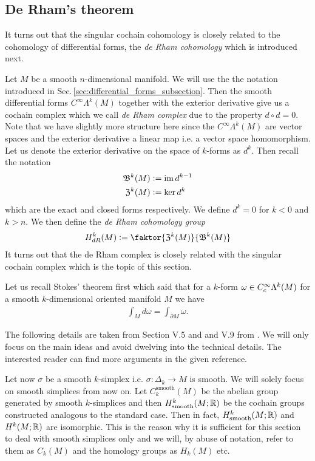 \documentclass[../master_thesis.tex]{subfiles}
\begin{document}
\subsection{De Rham's theorem} \label{sec:de_rhams_theorem}

It turns out that the singular cochain cohomology is closely related to the cohomology 
of differential forms, the \textit{de Rham cohomology} which is introduced next. 

Let $M$ be a smooth $n$-dimensional manifold.
We will use the the notation introduced in 
Sec.\,\ref{sec:differential_forms_subsection}. Then the smooth 
differential forms $C^\infty \Lambda^k (M)$ together 
with the exterior derivative give us a cochain complex which we call 
\textit{de Rham complex} due to the property $d \circ d = 0$. 
Note that we have slightly more structure here
since the $C^\infty \Lambda^k (M)$ are vector spaces and the exterior
derivative a linear map i.e. a vector space homomorphism.
Let us denote the exterior derivative on 
the space of $k$-forms as $d^k$. Then recall the notation
\begin{align*}
    \mathfrak{B}^k(M) &\vcentcolon= \operatorname{im} d^{k-1}
    \\ \mathfrak{Z}^k(M) &\vcentcolon= \ker d^k
\end{align*}
which are the exact and closed forms respectively.
We define $d^k = 0$ for $k < 0$ and $k>n$.
We then define the \textit{de Rham cohomology group} 
\begin{align*}
    H_{dR}^k(M) \vcentcolon= \faktor{\mathfrak{Z}^k(M)}{\mathfrak{B}^k(M)}
\end{align*}
It turns out that the de Rham complex is closely related with the 
singular cochain complex which is the topic of this section.

Let us recall Stokes' theorem first which said 
that for a $k$-form $\omega \in C_c^\infty \Lambda^{k}(M)$ 
for a smooth $k$-dimensional oriented manifold $M$ we have 
\begin{align*}
    \int_M d\omega = \int_{\partial M} \omega.
\end{align*}

The following details are taken from Section V.5 and and V.9 from 
\cite{topology_and_geometry}. We will only focus on the main ideas and avoid 
dwelving into the technical details. The interested reader can find more 
arguments in the given reference.

Let now $\sigma$ be a smooth $k$-simplex i.e. $\sigma: \Delta_k \rightarrow 
M$ is smooth. We will solely focus on smooth simplices from now on. Let 
$C_k^{\text{smooth}}(M)$ be the abelian group generated by smooth $k$-simplices and 
then $H^k_{\text{smooth}}(M;\mathbb{R})$ be the cochain groups constructed analogous to the 
standard case. Then in fact, 
$H^k_{\text{smooth}}(M;\mathbb{R})$ and $H^k(M;\mathbb{R})$ are isomorphic. This 
is the reason why it is sufficient for this section to deal with smooth simplices 
only and we will, by abuse of notation, refer to them as $C_k(M)$
and the homology groups as $H_k(M)$ etc.
\end{document}
